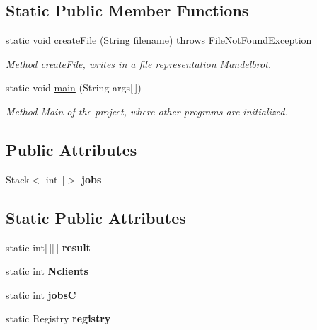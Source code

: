 \subsection*{Static Public Member Functions}
\begin{DoxyCompactItemize}
\item 
static void \hyperlink{class_server_ac4b46a4fdb4d54989142dee6b3e3f551}{create\+File} (String filename)  throws File\+Not\+Found\+Exception 	
\begin{DoxyCompactList}\small\item\em Method create\+File, writes in a file representation Mandelbrot. \end{DoxyCompactList}\item 
static void \hyperlink{class_server_ad90c92078da8d9c8a084e7cbc6cff4af}{main} (String args\mbox{[}$\,$\mbox{]})
\begin{DoxyCompactList}\small\item\em Method Main of the project, where other programs are initialized. \end{DoxyCompactList}\end{DoxyCompactItemize}
\subsection*{Public Attributes}
\begin{DoxyCompactItemize}
\item 
Stack$<$ int\mbox{[}$\,$\mbox{]}$>$ {\bfseries jobs}\hypertarget{class_server_ac8de6e7c3420f1bcc262d9eda19141c0}{}\label{class_server_ac8de6e7c3420f1bcc262d9eda19141c0}

\end{DoxyCompactItemize}
\subsection*{Static Public Attributes}
\begin{DoxyCompactItemize}
\item 
static int\mbox{[}$\,$\mbox{]}\mbox{[}$\,$\mbox{]} {\bfseries result}\hypertarget{class_server_a6ff98d91c732a89679431fad2c17ba4b}{}\label{class_server_a6ff98d91c732a89679431fad2c17ba4b}

\item 
static int {\bfseries Nclients}\hypertarget{class_server_aa5c8c04397758a903dda11ec51d406dc}{}\label{class_server_aa5c8c04397758a903dda11ec51d406dc}

\item 
static int {\bfseries jobsC}\hypertarget{class_server_a9cea4903754e8fe6fa8bc7d194a44f76}{}\label{class_server_a9cea4903754e8fe6fa8bc7d194a44f76}

\item 
static Registry {\bfseries registry}\hypertarget{class_server_a23960caa819012af45800c856775294a}{}\label{class_server_a23960caa819012af45800c856775294a}

\end{DoxyCompactItemize}


